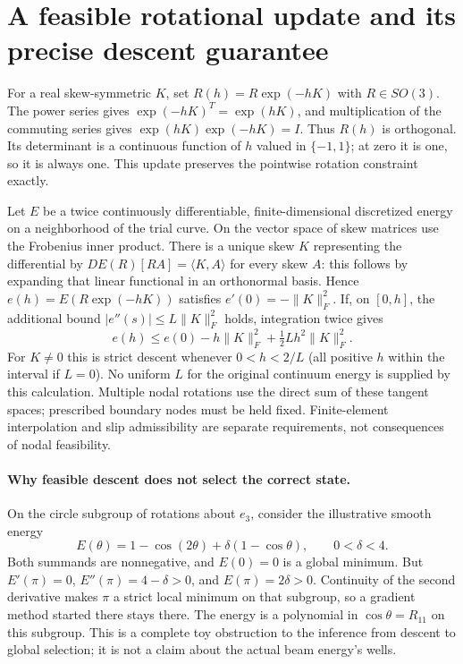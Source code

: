 \documentclass[11pt]{article}
\begin{document}
\section{A feasible rotational update and its precise descent guarantee}
For a real skew-symmetric $K$, set $R(h)=R\exp(-hK)$ with $R\in SO(3)$.
The power series gives $\exp(-hK)^T=\exp(hK)$, and multiplication of the
commuting series gives $\exp(hK)\exp(-hK)=I$. Thus $R(h)$ is orthogonal.
Its determinant is a continuous function of $h$ valued in $\{-1,1\}$;
at zero it is one, so it is always one. This update preserves the
pointwise rotation constraint exactly.

Let $E$ be a twice continuously differentiable, finite-dimensional
discretized energy on a neighborhood of the trial curve. On the vector
space of skew matrices use the Frobenius inner product. There is a unique
skew $K$ representing the differential by
$DE(R)[RA]=\langle K,A\rangle$ for every skew $A$: this follows by
expanding that linear functional in an orthonormal basis. Hence
$e(h)=E(R\exp(-hK))$ satisfies $e'(0)=-\|K\|_F^2$.
If, on $[0,h]$, the additional bound
$|e''(s)|\le L\|K\|_F^2$ holds, integration twice gives
\[
e(h)\le e(0)-h\|K\|_F^2+\tfrac12Lh^2\|K\|_F^2.
\]
For $K\ne0$ this is strict descent whenever $0<h<2/L$ (all positive
$h$ within the interval if $L=0$). No uniform $L$ for the original
continuum energy is supplied by this calculation. Multiple nodal rotations
use the direct sum of these tangent spaces; prescribed boundary nodes
must be held fixed. Finite-element interpolation and slip admissibility
are separate requirements, not consequences of nodal feasibility.

\paragraph{Why feasible descent does not select the correct state.}
On the circle subgroup of rotations about $e_3$, consider the illustrative
smooth energy
\[
E(\theta)=1-\cos(2\theta)+\delta(1-\cos\theta),\qquad 0<\delta<4.
\]
Both summands are nonnegative, and $E(0)=0$ is a global minimum.
But $E'(\pi)=0$, $E''(\pi)=4-\delta>0$, and $E(\pi)=2\delta>0$.
Continuity of the second derivative makes $\pi$ a strict local minimum
on that subgroup, so a gradient method started there stays there.
The energy is a polynomial in $\cos\theta=R_{11}$ on this subgroup.
This is a complete toy obstruction to the inference from descent to
global selection; it is not a claim about the actual beam energy's wells.
\end{document}
